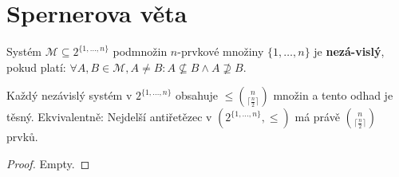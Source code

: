 \section{Spernerova věta}

\begin{definice}
	Systém $\mathcal{M} \subseteq 2^{ \{ 1, \dots , n \} }$ podmnožin $n$-prvkové množiny $\{ 1, \dots , n \}$ je \textbf{nezá-\newline vislý}, pokud platí: $\forall A, B \in \mathcal{M}, A \neq B: A \nsubseteq B \land A \nsupseteq B$.
\end{definice}

\begin{veta}
	Každý nezávislý systém v $2^{ \{ 1, \dots , n \} }$ obsahuje $\leq \binom{n}{\lceil \frac{n}{2}\rceil}$ množin a tento odhad je těsný. Ekvivalentně: Nejdelší antiřetězec v $(2^{ \{ 1, \dots , n \} }, \leq)$ má právě $\binom{n}{\lceil \frac{n}{2}\rceil}$ prvků.
\end{veta}

\begin{proof}
	Empty.
\end{proof}

